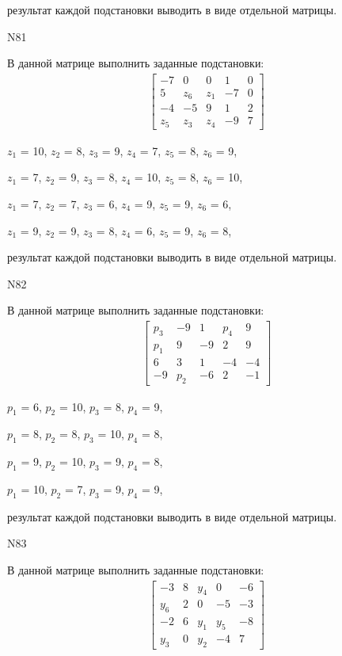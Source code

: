 \documentclass[11pt]{report}
\begin{document}
результат каждой подстановки выводить в виде отдельной матрицы.

N81

В данной матрице выполнить заданные подстановки:
\begin{align*}
\left[\begin{matrix}-7 & 0 & 0 & 1 & 0\\5 & z_{6} & z_{1} & -7 & 0\\-4 & -5 & 9 & 1 & 2\\z_{5} & z_{3} & z_{4} & -9 & 7\end{matrix}\right]
\end{align*}


$z_{1}$ = 10, $z_{2}$ = 8, $z_{3}$ = 9, $z_{4}$ = 7, $z_{5}$ = 8, $z_{6}$ = 9, 

$z_{1}$ = 7, $z_{2}$ = 9, $z_{3}$ = 8, $z_{4}$ = 10, $z_{5}$ = 8, $z_{6}$ = 10, 

$z_{1}$ = 7, $z_{2}$ = 7, $z_{3}$ = 6, $z_{4}$ = 9, $z_{5}$ = 9, $z_{6}$ = 6, 

$z_{1}$ = 9, $z_{2}$ = 9, $z_{3}$ = 8, $z_{4}$ = 6, $z_{5}$ = 9, $z_{6}$ = 8, 

результат каждой подстановки выводить в виде отдельной матрицы.

N82

В данной матрице выполнить заданные подстановки:
\begin{align*}
\left[\begin{matrix}p_{3} & -9 & 1 & p_{4} & 9\\p_{1} & 9 & -9 & 2 & 9\\6 & 3 & 1 & -4 & -4\\-9 & p_{2} & -6 & 2 & -1\end{matrix}\right]
\end{align*}


$p_{1}$ = 6, $p_{2}$ = 10, $p_{3}$ = 8, $p_{4}$ = 9, 

$p_{1}$ = 8, $p_{2}$ = 8, $p_{3}$ = 10, $p_{4}$ = 8, 

$p_{1}$ = 9, $p_{2}$ = 10, $p_{3}$ = 9, $p_{4}$ = 8, 

$p_{1}$ = 10, $p_{2}$ = 7, $p_{3}$ = 9, $p_{4}$ = 9, 

результат каждой подстановки выводить в виде отдельной матрицы.

N83

В данной матрице выполнить заданные подстановки:
\begin{align*}
\left[\begin{matrix}-3 & 8 & y_{4} & 0 & -6\\y_{6} & 2 & 0 & -5 & -3\\-2 & 6 & y_{1} & y_{5} & -8\\y_{3} & 0 & y_{2} & -4 & 7\end{matrix}\right]
\end{align*}
\end{document}
